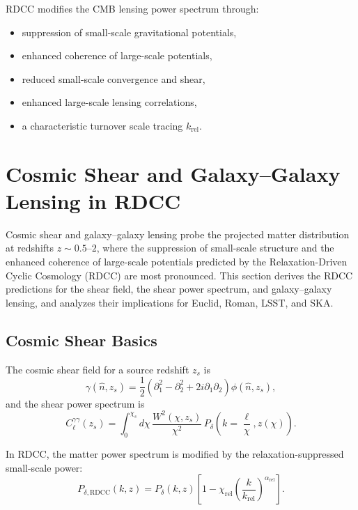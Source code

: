\documentclass[11pt,a4paper]{article}
\begin{document}
RDCC modifies the CMB lensing power spectrum through:
\begin{itemize}
\item suppression of small-scale gravitational potentials,
\item enhanced coherence of large-scale potentials,
\item reduced small-scale convergence and shear,
\item enhanced large-scale lensing correlations,
\item a characteristic turnover scale tracing $k_{\mathrm{rel}}$.
\end{itemize}

\section{Cosmic Shear and Galaxy–Galaxy Lensing in RDCC}

Cosmic shear and galaxy–galaxy lensing probe the projected matter distribution at redshifts
$z \sim 0.5$–$2$, where the suppression of small-scale structure and the enhanced coherence of
large-scale potentials predicted by the Relaxation-Driven Cyclic Cosmology (RDCC) are most
pronounced. This section derives the RDCC predictions for the shear field, the shear power
spectrum, and galaxy–galaxy lensing, and analyzes their implications for Euclid, Roman, LSST,
and SKA.

\subsection{Cosmic Shear Basics}

The cosmic shear field for a source redshift $z_{s}$ is
\begin{equation}
\gamma(\hat{n},z_{s})
=
\frac{1}{2}
\left(
\partial_{1}^{2}
-
\partial_{2}^{2}
+
2i\partial_{1}\partial_{2}
\right)
\phi(\hat{n},z_{s}),
\end{equation}
and the shear power spectrum is
\begin{equation}
C_{\ell}^{\gamma\gamma}(z_{s})
=
\int_{0}^{\chi_{s}}
d\chi\,
\frac{W^{2}(\chi,z_{s})}{\chi^{2}}\,
P_{\delta}\!\left(k=\frac{\ell}{\chi},z(\chi)\right).
\end{equation}

In RDCC, the matter power spectrum is modified by the relaxation-suppressed small-scale
power:
\begin{equation}
P_{\delta,\mathrm{RDCC}}(k,z)
=
P_{\delta}(k,z)
\left[
1
-
\chi_{\mathrm{rel}}
\left(
\frac{k}{k_{\mathrm{rel}}}
\right)^{\alpha_{\mathrm{rel}}}
\right].
\end{equation}
\end{document}
